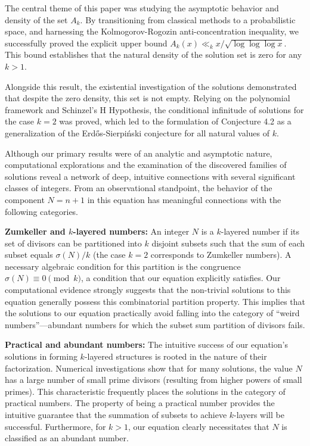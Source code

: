 \documentclass[12pt, a4paper]{article}
\theoremstyle{plain}
\theoremstyle{definition}
\begin{document}
The central theme of this paper was studying the asymptotic behavior and density of the set $A_k$. By transitioning from classical methods to a probabilistic space, and harnessing the Kolmogorov-Rogozin anti-concentration inequality, we successfully proved the explicit upper bound $A_k(x) \ll_k x / \sqrt{\log \log \log x}$. This bound establishes that the natural density of the solution set is zero for any $k > 1$.

Alongside this result, the existential investigation of the solutions demonstrated that despite the zero density, this set is not empty. Relying on the polynomial framework and Schinzel's H Hypothesis, the conditional infinitude of solutions for the case $k = 2$ was proved, which led to the formulation of Conjecture 4.2 as a generalization of the Erdős-Sierpiński conjecture for all natural values of $k$.

Although our primary results were of an analytic and asymptotic nature, computational explorations and the examination of the discovered families of solutions reveal a network of deep, intuitive connections with several significant classes of integers. From an observational standpoint, the behavior of the component $N = n + 1$ in this equation has meaningful connections with the following categories.

\textbf{Zumkeller and $k$-layered numbers:} An integer $N$ is a $k$-layered number if its set of divisors can be partitioned into $k$ disjoint subsets such that the sum of each subset equals $\sigma(N)/k$ (the case $k = 2$ corresponds to Zumkeller numbers). A necessary algebraic condition for this partition is the congruence $\sigma(N) \equiv 0 \pmod{k}$, a condition that our equation explicitly satisfies. Our computational evidence strongly suggests that the non-trivial solutions to this equation generally possess this combinatorial partition property. This implies that the solutions to our equation practically avoid falling into the category of ``weird numbers''---abundant numbers for which the subset sum partition of divisors fails.

\textbf{Practical and abundant numbers:} The intuitive success of our equation's solutions in forming $k$-layered structures is rooted in the nature of their factorization. Numerical investigations show that for many solutions, the value $N$ has a large number of small prime divisors (resulting from higher powers of small primes). This characteristic frequently places the solutions in the category of practical numbers. The property of being a practical number provides the intuitive guarantee that the summation of subsets to achieve $k$-layers will be successful. Furthermore, for $k > 1$, our equation clearly necessitates that $N$ is classified as an abundant number.
\end{document}
